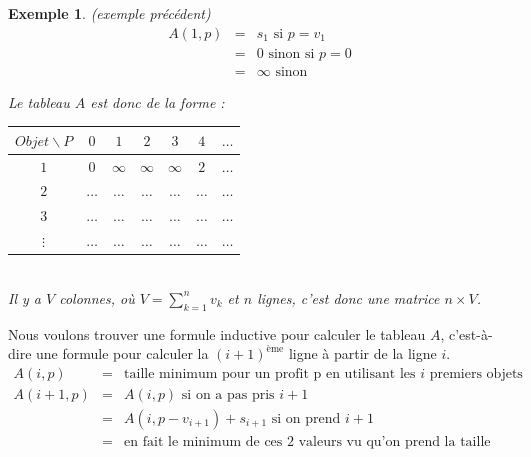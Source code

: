 \documentclass[12pt]{article}
\newtheorem{exemple}{Exemple}[section]
\begin{document}
\begin{exemple} \textit{(exemple précédent)}
\begin{eqnarray}
\nonumber A(1,p) & = & s_1 \text{ si }p=v_1 \\
\nonumber 	     & = & 0 \text{ sinon si } p = 0 \\
\nonumber 		 & = & \infty \text{ sinon}
\end{eqnarray}



Le tableau $A$ est donc de la forme :
\begin{center}\begin{tabular}{c|cccccc}
$Objet\backslash P$ & $0$ & $1$ & $2$ & $3$ & $4$ & $\ldots$ \\
\hline
$1$ & $0$ & $\infty$ & $\infty$ & $\infty$ & $2$ & $\ldots$ \\
$2$ & $\ldots$ & $\ldots$ & $\ldots$ & $\ldots$ & $\ldots$ & $\ldots$ \\
$3$ & $\ldots$ & $\ldots$ & $\ldots$ & $\ldots$ & $\ldots$ & $\ldots$ \\
$\vdots$ & $\ldots$ & $\ldots$ & $\ldots$ & $\ldots$ & $\ldots$ & $\ldots$ \\
\end{tabular}\end{center}$ $\\
Il y a $V$ colonnes, où $V = \sum_{k=1}^n v_k$ et $n$ lignes, c'est donc une matrice $n\times V$.
\end{exemple}

Nous voulons trouver une formule inductive pour calculer le tableau $A$, c'est-à-dire une formule pour calculer la $(i+1)^{\text{ème}}$ ligne
à partir de la ligne $i$.
\begin{eqnarray}
\nonumber A(i,p) & = & \text{taille minimum pour un profit p en utilisant les $i$ premiers objets}\\
\nonumber A(i+1,p) & = & A(i,p) \text{ si on a pas pris } i+1 \\
\nonumber 		& = & A(i,p-v_{i+1}) + s_{i+1} \text{ si on prend } i+1\\
\nonumber 		& = & \text{en fait le minimum de ces 2 valeurs vu qu'on prend la taille minimum}
\end{eqnarray}
\end{document}
